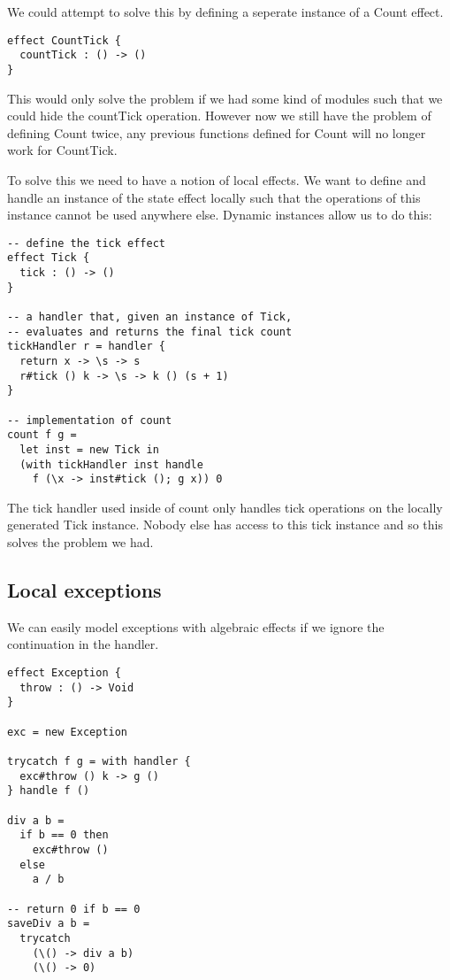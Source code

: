 \documentclass[12pt]{article}
\begin{document}
We could attempt to solve this by defining a seperate instance of a Count effect.

\begin{verbatim}
effect CountTick {
  countTick : () -> ()
}
\end{verbatim}

This would only solve the problem if we had some kind of modules such that we could hide the countTick operation.
However now we still have the problem of defining Count twice, any previous functions defined for Count will no longer work for CountTick.

To solve this we need to have a notion of local effects.
We want to define and handle an instance of the state effect locally such that the operations of this instance cannot be used anywhere else.
Dynamic instances allow us to do this:

\begin{verbatim}
-- define the tick effect
effect Tick {
  tick : () -> ()
}

-- a handler that, given an instance of Tick,
-- evaluates and returns the final tick count
tickHandler r = handler {
  return x -> \s -> s
  r#tick () k -> \s -> k () (s + 1)
}

-- implementation of count
count f g =
  let inst = new Tick in
  (with tickHandler inst handle
    f (\x -> inst#tick (); g x)) 0
\end{verbatim}

The tick handler used inside of count only handles tick operations on the locally generated Tick instance.
Nobody else has access to this tick instance and so this solves the problem we had.

\subsection{Local exceptions}

We can easily model exceptions with algebraic effects if we ignore the continuation in the handler.

\begin{verbatim}
effect Exception {
  throw : () -> Void
}

exc = new Exception

trycatch f g = with handler {
  exc#throw () k -> g ()
} handle f ()

div a b =
  if b == 0 then
    exc#throw ()
  else
    a / b

-- return 0 if b == 0
saveDiv a b =
  trycatch
    (\() -> div a b)
    (\() -> 0)
\end{verbatim}
\end{document}
